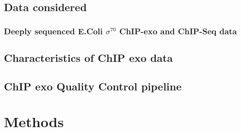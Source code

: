 \documentclass{bmcart}\usepackage[]{graphicx}\usepackage[]{color}
\begin{document}
\subsection{Data considered}
\label{sec:alldata}



\subsubsection{Deeply sequenced E.Coli $\sigma^{70}$ ChIP-exo and ChIP-Seq data}
\label{sec:ourdata}




\subsection{Characteristics of ChIP exo data}
\label{sec:charac}





\subsection{ChIP exo Quality Control pipeline}
\label{sec:QC}





\section*{Methods}
\label{sec:methods}







\nocite{exo_gb}
\end{document}
